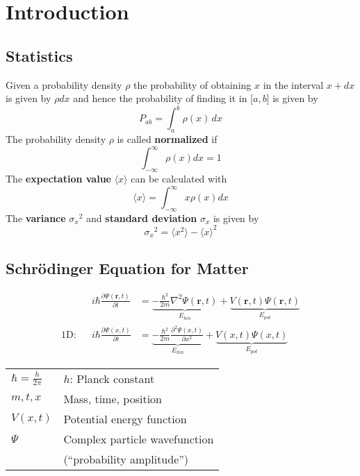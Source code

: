 \section{Introduction}
\subsection{Statistics}
Given a probability density $\rho$ the probability of obtaining $x$ in the interval $x+dx$ is given by $\rho dx$ and hence the probability of finding it in [$a,b$] is given by
\begin{equation*}
    P_{ab}=\int_{a}^{b} \rho(x)\, dx
\end{equation*}
The probability density $\rho$ is called \textbf{normalized} if
\begin{equation*}
    \int_{-\infty}^{\infty}\rho(x)dx = 1
\end{equation*}
The \textbf{expectation value} $\langle x \rangle$ can be calculated with
\begin{equation*}
    \langle x \rangle = \int_{-\infty}^{\infty} x\rho(x) dx
\end{equation*}
The \textbf{variance} ${\sigma_x}^2$ and \textbf{standard deviation} $\sigma_x$ is given by
\begin{equation*}
    {\sigma_x}^2 = \langle x^2 \rangle - {\langle x \rangle }^2
\end{equation*}

\subsection{Schrödinger Equation for Matter}
\begin{align*}
               &  & i\hbar \frac{\partial \Psi(\mathbf{r},t)}{\partial t} & = \underbrace{- \frac{\hbar^2}{2m} \nabla^2 \Psi(\mathbf{r},t)}_{E_{kin}} + \underbrace{V(\mathbf{r},t)\Psi(\mathbf{r},t)}_{E_{pot}} \\
    \text{1D:} &  & i\hbar \frac{\partial \Psi(x,t)}{\partial t}          & = \underbrace{- \frac{\hbar^2}{2m} \frac{\partial^2 \Psi(x,t)}{\partial x^2}}_{E_{kin}} + \underbrace{V(x,t)\Psi(x,t)}_{E_{pot}}
\end{align*}

\renewcommand{\arraystretch}{1.3}
\setlength\tabcolsep{6pt} %
\begin{tabularx}{\linewidth}{@{}ll@{}}
    $\hbar = \frac{h}{2\pi}$ & $h$: Planck constant          \\
    $m,t,x$                  & Mass, time, position          \\
    $V(x,t)$                 & Potential energy function     \\
    $\Psi$                   & Complex particle wavefunction \\
                             & (``probability amplitude'')     \\
\end{tabularx}
\renewcommand{\arraystretch}{1}
\setlength\tabcolsep{6pt} %

